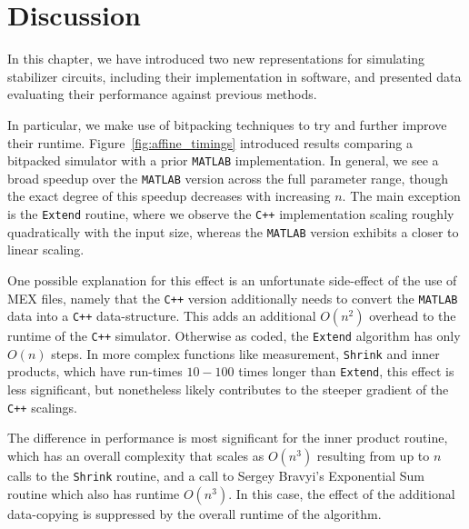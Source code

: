 \section{Discussion}\label{sec:stabilizer_discussion}
In this chapter, we have introduced two new representations for simulating stabilizer circuits, including their implementation in software, and presented data evaluating their performance against previous methods.\par
In particular, we make use of bitpacking techniques to try and further improve their runtime. Figure~\ref{fig:affine_timings} introduced results comparing a bitpacked simulator with a prior \texttt{MATLAB} implementation. In general, we see a broad speedup over the \texttt{MATLAB} version across the full parameter range, though the exact degree of this speedup decreases with increasing $n$. The main exception is the \texttt{Extend} routine, where we observe the \texttt{C++} implementation scaling roughly quadratically with the input size, whereas the \texttt{MATLAB} version exhibits a closer to linear scaling.\par
One possible explanation for this effect is an unfortunate side-effect of the use of MEX files, namely that the \texttt{C++} version additionally needs to convert the \texttt{MATLAB} data into a \texttt{C++} data-structure. This adds an additional $O(n^{2})$ overhead to the runtime of the \texttt{C++} simulator. Otherwise as coded, the \texttt{Extend} algorithm has only $O(n)$ steps. In more complex functions like measurement, \texttt{Shrink} and inner products, which have run-times $10-100$ times longer than \texttt{Extend}, this effect is less significant, but nonetheless likely contributes to the steeper gradient of the \texttt{C++} scalings.\par
The difference in performance is most significant for the inner product routine, which has an overall complexity that scales as $O(n^{3})$ resulting from up to $n$ calls to the \texttt{Shrink} routine, and a call to Sergey Bravyi's Exponential Sum routine which also has runtime $O(n^{3})$. In this case, the effect of the additional data-copying is suppressed by the overall runtime of the algorithm. \par
